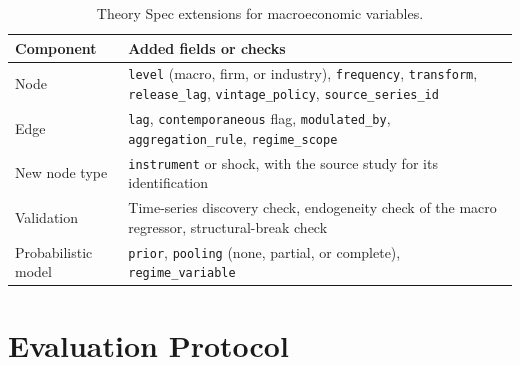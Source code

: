   \begin{table}[H]
    \centering
    \begin{tabularx}{\linewidth}{lX}
      \toprule
      Component & Added fields or checks \\
      \midrule
      Node & \texttt{level} (macro, firm, or industry), \texttt{frequency},
      \texttt{transform}, \texttt{release\_lag}, \texttt{vintage\_policy},
      \texttt{source\_series\_id} \\
      Edge & \texttt{lag}, \texttt{contemporaneous} flag,
      \texttt{modulated\_by}, \texttt{aggregation\_rule},
      \texttt{regime\_scope} \\
      New node type & \texttt{instrument} or shock, with the source study for
      its identification \\
      Validation & Time-series discovery check, endogeneity check of the macro
      regressor, structural-break check \\
      Probabilistic model & \texttt{prior}, \texttt{pooling} (none, partial,
      or complete), \texttt{regime\_variable} \\
      \bottomrule
    \end{tabularx}
    \caption{Theory Spec extensions for macroeconomic variables.}
    \label{tab:macro_fields}
  \end{table}

  \section{Evaluation Protocol}\label{sec:evaluation}


